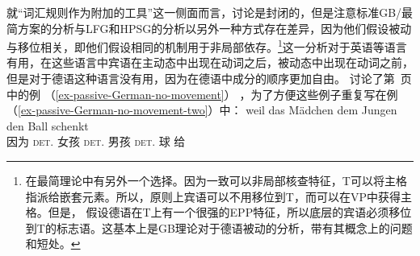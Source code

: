 就“词汇规则作为附加的工具”这一侧面而言，讨论是封闭的，但是注意标准GB/最简方案的分析与LFG和HPSG的分析以另外一种方式存在差异，因为他们假设被动与移位相关，即他们假设相同的机制用于非局部依存。\footnote{%
在最简理论中有另外一个选择。因为一致可以非局部核查特征，T可以将主格指派给嵌套元素。所以，原则上宾语可以不用移位到T，而可以在VP中获得主格。但是， \citet[]{Adger2003a}假设德语在T上有一个很强的EPP特征，所以底层的宾语必须移位到T的标志语。这基本上是GB理论对于德语被动的分析，带有其概念上的问题和短处。  
}这一分析对于英语等语言有用，在这些语言中宾语在主动态中出现在动词之后，被动态中出现在动词之前，但是对于德语这种语言没有用，因为在德语中成分的顺序更加自由。 \citet[\S~4.4.3]{Lenerz77}讨论了第~\pageref{ex-passive-German-no-movement}页中的例 （\ref{ex-passive-German-no-movement}） ，为了方便这些例子重复写在例（\ref{ex-passive-German-no-movement-two}）中：
\eal
\label{ex-passive-German-no-movement-two}
\ex 
\gll weil das Mädchen dem Jungen den Ball schenkt\\
     因为 \textsc{det}.\nom{} 女孩 \textsc{det}.\dat{} 男孩 \textsc{det}.\acc{} 球 给\\
